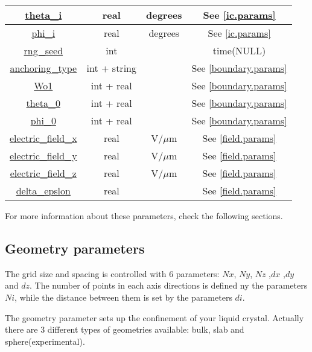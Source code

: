 \documentclass{article}
\begin{document}
\begin{center}
\begin{longtable}{|c|c|c|c|}
          \hline 
          \hyperref[ic.param]{theta\_i} &	real & degrees & See \ref{ic.params} \\ 
          \hline 
          \hyperref[ic.param]{phi\_i} &	real & degrees  & See \ref{ic.params}\\ 
          \hline 
          \hyperref[ic.param]{rng_seed} &	int &  & time(NULL)\\ 
          \hline 
          \hyperref[boundary.params]{anchoring\_type} & int + string & & See \ref{boundary.params}\\ 
          \hline 
          \hyperref[boundary.params]{Wo1}& int + real & &  See \ref{boundary.params}  \\ 
          \hline 
          \hyperref[boundary.params]{theta\_0} &  int + real  & & See \ref{boundary.params} \\ 
          \hline 
          \hyperref[boundary.params]{phi\_0} &	 int + real  & & See \ref{boundary.params} \\ 
          \hline 
          \hyperref[field.params]{electric\_field\_x} &	 real  & V/$\mu$m & See \ref{field.params} \\ 
          \hline 
          \hyperref[field.params]{electric\_field\_y} &	 real  & V/$\mu$m & See \ref{field.params} \\ 
          \hline 
          \hyperref[field.params]{electric\_field\_z} &	 real  & V/$\mu$m & See \ref{field.params} \\ 
          \hline 
          \hyperref[field.params]{delta\_epslon} &	 real  & & See \ref{field.params} \\ 
          \hline 	
	\end{longtable} 
\end{center}

For more information about these parameters, check the following sections.


\subsection{Geometry parameters}\label{geometry}

The grid size and spacing is controlled with 6 parameters: $Nx$, $Ny$,
$Nz$ ,$dx$ ,$dy$ and $dz$. The number of points in each axis
directions is defined ny the parameters $Ni$, while the distance
between them is set by the parameters $di$.

The geometry parameter sets up the confinement of your liquid
crystal. Actually there are 3 different types of geometries available:
bulk, slab and sphere(experimental).
\end{document}
